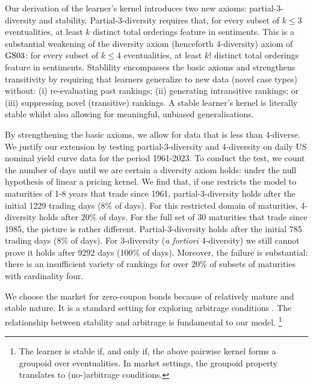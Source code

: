 \documentclass[ecta,nameyear,draft]{econsocart}
\newcommand{\gsii}{$\textup{GS03}$}
\theoremstyle{plain}
\theoremstyle{remark}
\begin{document}
Our derivation of the learner's kernel introduces two new axioms:
partial-3-diversity and stability. Partial-3-diversity requires that, for every
subset of $k \leq 3$ eventualities, at least $k$ distinct total orderings
feature in {sentiments}. This is a substantial weakening of the diversity axiom
(henceforth 4-diversity) axiom of \gsii: for every subset of $k \leq 4$
eventualities, at least $k!$ distinct total orderings feature in sentiments.
Stablility encompasses the basic axioms and strengthens transitivity
by requiring that learners generalize to new data (novel case types) without:
(i) re-evaluating past rankings; (ii) generating intransitive rankings; or
(iii) suppressing novel (transitive) rankings. A stable learner's kernel is
literally stable whilst also allowing for meaningful, unbiased generalisations.

By strengthening the basic axioms, we allow for data that is less than
4-diverse. We justify our extension by testing partial-3-diversity and
4-diversity on daily US nominal yield curve data for the period 1961-2023. To
conduct the test, we count the number of days until we are certain a diversity
axiom holds: under the null hypothesis of linear a pricing kernel. We find
that, if one restricts the model to maturities of 1-8 years that trade since
1961, partial-3-diversity holds after the initial 1229 trading days (8\% of
days). For this restricted domain of maturities, 4-diversity holds after 20\%
of days. For the full set of 30 maturities that trade since 1985, the picture
is rather different. Partial-3-diversity holds after the initial 785 trading
days (8\% of days). For 3-diversity (\emph{a fortiori} 4-diversity) we still
cannot prove it holds after 9292 days (100\% of days). Moreover, the failure is
substantial: there is an insufficient variety of rankings  for over 20\% of
subsets of maturities with cardinality four.
 
We choose the market for zero-coupon bonds because of relatively mature and
stable nature. It is a standard setting for exploring arbitrage conditions
\citep{barillas2019speculation}. The relationship between stability and
arbitrage is fundamental to our model.
\footnote{The learner is stable if, and
  only if, the above pairwise kernel forms a groupoid over eventualities. In
  market settings, the groupoid property translates to (no-)arbitrage
conditions.}
\end{document}
